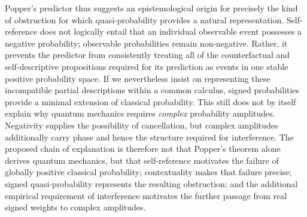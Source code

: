 Popper's predictor thus suggests an epistemological origin for precisely the kind of obstruction for which quasi-probability provides a natural representation. Self-reference does not logically entail that an individual observable event possesses a negative probability; observable probabilities remain non-negative. Rather, it prevents the predictor from consistently treating all of the counterfactual and self-descriptive propositions required for its prediction as events in one stable positive probability space. If we nevertheless insist on representing these incompatible partial descriptions within a common calculus, signed probabilities provide a minimal extension of classical probability. This still does not by itself explain why quantum mechanics requires \emph{complex} probability amplitudes. Negativity supplies the possibility of cancellation, but complex amplitudes additionally carry phase and hence the structure required for interference. The proposed chain of explanation is therefore not that Popper's theorem alone derives quantum mechanics, but that self-reference motivates the failure of globally positive classical probability; contextuality makes that failure precise; signed quasi-probability represents the resulting obstruction; and the additional empirical requirement of interference motivates the further passage from real signed weights to complex amplitudes.
